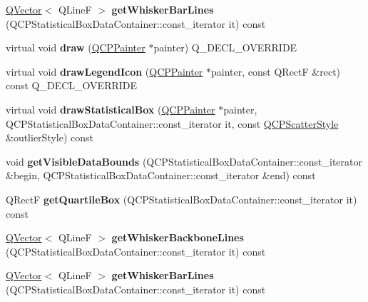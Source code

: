 \begin{DoxyCompactItemize}
\hyperlink{class_q_vector}{Q\+Vector}$<$ Q\+LineF $>$ {\bfseries get\+Whisker\+Bar\+Lines} (Q\+C\+P\+Statistical\+Box\+Data\+Container\+::const\+\_\+iterator it) const
\item 
\mbox{\label{class_q_c_p_statistical_box_abd117b6a1a29a0160728b75d48cffd8b}} 
virtual void {\bfseries draw} (\hyperlink{class_q_c_p_painter}{Q\+C\+P\+Painter} $\ast$painter) Q\+\_\+\+D\+E\+C\+L\+\_\+\+O\+V\+E\+R\+R\+I\+DE
\item 
\mbox{\label{class_q_c_p_statistical_box_adffd972086797d416a5e3bb974fd45d7}} 
virtual void {\bfseries draw\+Legend\+Icon} (\hyperlink{class_q_c_p_painter}{Q\+C\+P\+Painter} $\ast$painter, const Q\+RectF \&rect) const Q\+\_\+\+D\+E\+C\+L\+\_\+\+O\+V\+E\+R\+R\+I\+DE
\item 
\mbox{\label{class_q_c_p_statistical_box_a2f9f8283f69124fd004ecccb7a62691a}} 
virtual void {\bfseries draw\+Statistical\+Box} (\hyperlink{class_q_c_p_painter}{Q\+C\+P\+Painter} $\ast$painter, Q\+C\+P\+Statistical\+Box\+Data\+Container\+::const\+\_\+iterator it, const \hyperlink{class_q_c_p_scatter_style}{Q\+C\+P\+Scatter\+Style} \&outlier\+Style) const
\item 
\mbox{\label{class_q_c_p_statistical_box_a1c24e86384a4aced91d5216fce86b175}} 
void {\bfseries get\+Visible\+Data\+Bounds} (Q\+C\+P\+Statistical\+Box\+Data\+Container\+::const\+\_\+iterator \&begin, Q\+C\+P\+Statistical\+Box\+Data\+Container\+::const\+\_\+iterator \&end) const
\item 
\mbox{\label{class_q_c_p_statistical_box_aa44482bf991ceca74602294dd9977243}} 
Q\+RectF {\bfseries get\+Quartile\+Box} (Q\+C\+P\+Statistical\+Box\+Data\+Container\+::const\+\_\+iterator it) const
\item 
\mbox{\label{class_q_c_p_statistical_box_a840a9f02cb2418f83559613f8a9793e9}} 
\hyperlink{class_q_vector}{Q\+Vector}$<$ Q\+LineF $>$ {\bfseries get\+Whisker\+Backbone\+Lines} (Q\+C\+P\+Statistical\+Box\+Data\+Container\+::const\+\_\+iterator it) const
\item 
\mbox{\label{class_q_c_p_statistical_box_ac1010b8f46b94e84392c7499bb9afdab}} 
\hyperlink{class_q_vector}{Q\+Vector}$<$ Q\+LineF $>$ {\bfseries get\+Whisker\+Bar\+Lines} (Q\+C\+P\+Statistical\+Box\+Data\+Container\+::const\+\_\+iterator it) const
\end{DoxyCompactItemize}
